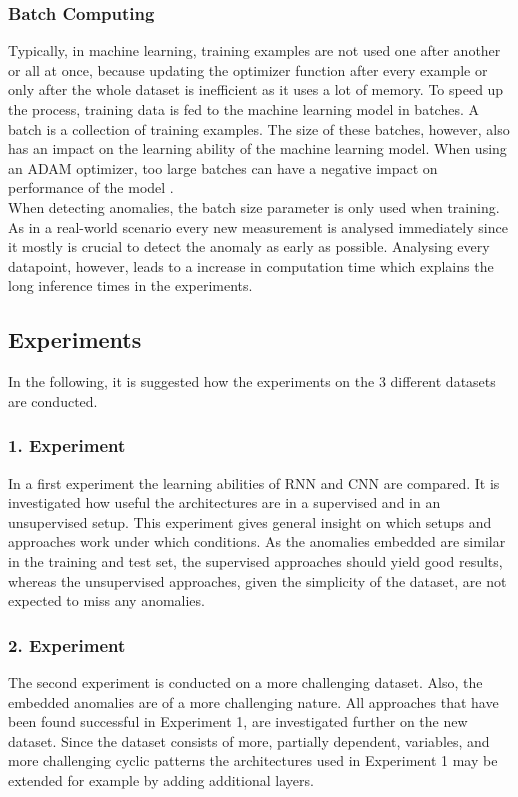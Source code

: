 \subsubsection{Batch Computing}
Typically, in machine learning, training examples are not used one after another or all at once, because updating the optimizer function after every example or only after the whole dataset is inefficient as it uses a lot of memory. To speed up the process, training data is fed to the machine learning model in batches. A batch is a collection of training examples. The size of these batches, however, also has an impact on the learning ability of the machine learning model. When using an ADAM optimizer, too large batches can have a negative impact on performance of the model \parencite{Krishnan2019}.\\
When detecting anomalies, the batch size parameter is only used when training. As in a real-world scenario every new measurement is analysed immediately since it mostly is crucial to detect the anomaly as early as possible. Analysing every datapoint, however, leads to a increase in computation time which explains the long inference times in the experiments.

\subsection{Experiments}
In the following, it is suggested how the experiments on the 3 different datasets are conducted.

\subsubsection{1. Experiment}
In a first experiment the learning abilities of RNN and CNN are compared. It is investigated how useful the architectures are in a supervised and in an unsupervised setup. This experiment gives general insight on which setups and approaches work under which conditions. As the anomalies embedded are similar in the training and test set, the supervised approaches should yield good results, whereas the unsupervised approaches, given the simplicity of the dataset, are not expected to miss any anomalies.

\subsubsection{2. Experiment}
The second experiment is conducted on a more challenging dataset. Also, the embedded anomalies are of a more challenging nature. All approaches that have been found successful in Experiment 1, are investigated further on the new dataset. Since the dataset consists of more, partially dependent, variables, and more challenging cyclic patterns the architectures used in Experiment 1 may be extended for example by adding additional layers. 


